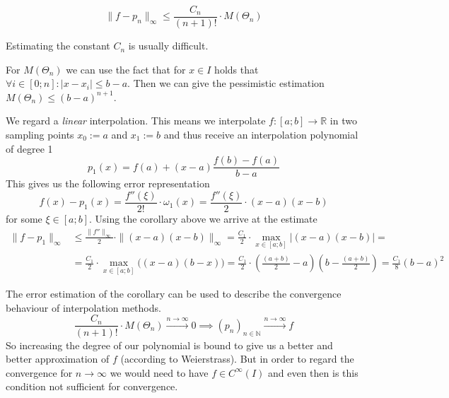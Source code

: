 \begin{corollary}
   \[\|f - p_n\|_\infty \leq \frac{C_n}{(n+1)!} \cdot M(\Theta_n)\]
\end{corollary}
\begin{remark}
   Estimating the constant \(C_n\) is usually difficult.

   For \(M(\Theta_n)\) we can use the fact that for \(x \in I\) holds that \(\forall i \in [0; n]: |x - x_i| \leq b - a\).
   Then we can give the pessimistic estimation \(M(\Theta_n) \leq (b - a)^{n+1}\).
\end{remark}

\begin{example}
   We regard a \emph{linear} interpolation.
   This means we interpolate \(f: [a; b] \to \mathbb{R}\) in two sampling points \(x_0 := a\) and \(x_1 := b\) and thus receive an interpolation polynomial of degree 1
   \[p_1(x) = f(a) + (x - a) \frac{f(b) - f(a)}{b - a}\]
   This gives us the following error representation
   \[f(x) - p_1(x) = \frac{f''(\xi)}{2!} \cdot \omega_1(x) = \frac{f''(\xi)}{2} \cdot (x-a)(x-b)\]
   for some \(\xi \in [a; b]\).
   Using the corollary above we arrive at the estimate
   \begin{equation*}
      \begin{split}
         \|f - p_1\|_\infty & \leq \frac{\|f''\|_\infty}{2} \cdot \|(x-a)(x-b)\|_\infty = \frac{C_1}{2} \cdot \max_{x \in [a; b]} \big|(x-a)(x-b)\big| = \\
                            & = \frac{C_1}{2} \cdot \max_{x \in [a;b]}\big((x-a)(b-x)\big) = \frac{C_1}{2} \cdot \left(\frac{(a+b)}{2} - a\right)\left(b - \frac{(a+b)}{2}\right) = \frac{C_1}{8} (b-a)^2
      \end{split}
   \end{equation*}
\end{example}

The error estimation of the corollary can be used to describe the convergence behaviour of interpolation methods.
\[\frac{C_n}{(n+1)!} \cdot M(\Theta_n) \xrightarrow{n \to \infty} 0 \implies (p_n)_{n \in \mathbb{N}} \xrightarrow{n \to \infty} f\]
So increasing the degree of our polynomial is bound to give us a better and better approximation of \(f\) (according to Weierstrass).
But in order to regard the convergence for \(n \to \infty\) we would need to have \(f \in C^\infty(I)\) and even then is this condition not sufficient for convergence.

